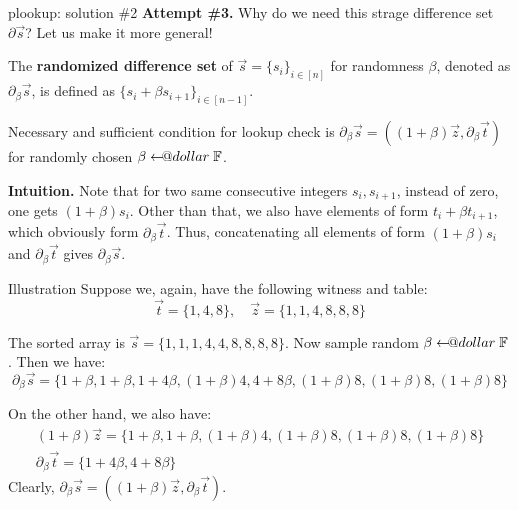 \documentclass{zkdl-presentation-template}
\makeatletter
\newcommand\leftarrowS{\leftarrow\joinrel\smalldollar}
\newcommand{\smalldollar}{\mathrel{\mathpalette\small@dollar\relax}}
\newcommand{\small@dollar}[2]{%
  \vcenter{\hbox{%
    $#1\textnormal{\fontsize{0.7\dimexpr\f@size pt}{0}\selectfont\$}$%
  }}%
}
\makeatother
\begin{document}
    \begin{frame}{plookup: solution \#2}
        \textbf{Attempt \#3.} Why do we need this strage difference set $\partial\vec{s}$? Let us 
        make it more general!
        \begin{definition}
            The \textbf{randomized difference set} of $\vec{s}=\{s_i\}_{i \in
            [n]}$ for randomness $\beta$, denoted as $\partial_{\beta}\vec{s}$,
            is defined as $\{s_i+\beta s_{i+1}\}_{i \in [n-1]}$.
        \end{definition} 

        \begin{lemma}
            Necessary and sufficient condition for lookup check is
            $\partial_{\beta}\vec{s} = ((1+\beta)\vec{z},
            \partial_{\beta}\vec{t})$ for randomly chosen $\beta \leftarrowS
            \mathbb{F}$.
        \end{lemma}

        \textbf{Intuition.} Note that for two same consecutive integers
        $s_i,s_{i+1}$, instead of zero, one gets $(1+\beta)s_i$. Other than
        that, we also have elements of form $t_i+\beta t_{i+1}$, which obviously
        form $\partial_{\beta}\vec{t}$. Thus, concatenating all elements of form
        $(1+\beta)s_i$ and $\partial_{\beta}\vec{t}$ gives
        $\partial_{\beta}\vec{s}$.
    \end{frame}

    \begin{frame}{Illustration}
        Suppose we, again, have the following witness and table:
        \begin{equation*}
            \vec{t} = \{1,4,8\}, \quad \vec{z} = \{1,1,4,8,8,8\}
        \end{equation*}

         The sorted array is $\vec{s} = \{1,1,1,4,4,8,8,8,8\}$. Now sample 
        random $\beta \leftarrowS \mathbb{F}$. Then we have:
        \begin{equation*}
            \partial_{\beta}\vec{s} = \{1+\beta,1+\beta,1+4\beta,(1+\beta)4,4+8\beta,(1+\beta)8,(1+\beta)8,(1+\beta)8\}
        \end{equation*}

         On the other hand, we also have:
        \begin{gather*}
            (1+\beta)\vec{z} = \{1+\beta,1+\beta,(1+\beta)4,(1+\beta)8,(1+\beta)8,(1+\beta)8\} \\
            \partial_{\beta}\vec{t} = \{1+4\beta, 4+8\beta\}
        \end{gather*}
         Clearly,
        $\partial_{\beta}\vec{s}=((1+\beta)\vec{z},\partial_{\beta}\vec{t})$.
    \end{frame}
\end{document}
